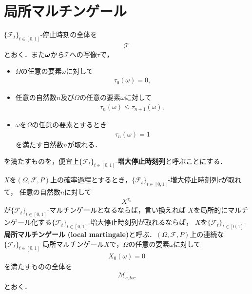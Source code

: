 \section{局所マルチンゲール}
	
	$\{\mathscr{F}_{t}\}_{t \in [0,1]}$-停止時刻の全体を
	\begin{align}
		\mathscr{T}
	\end{align}
	とおく．また${\boldsymbol \omega}$から$\mathscr{T}$への写像$\tau$で，
	\begin{itemize}
		\item $\Omega$の任意の要素$\omega$に対して
			\begin{align}
				\tau_{0}(\omega) = 0,
			\end{align}
			
		\item 任意の自然数$n$及び$\Omega$の任意の要素$\omega$に対して
			\begin{align}
				\tau_{n}(\omega) \leq \tau_{n+1}(\omega),
			\end{align}
			
		\item $\omega$を$\Omega$の任意の要素とするとき
			\begin{align}
				\tau_{n}(\omega) = 1
			\end{align}
			を満たす自然数$n$が取れる．
	\end{itemize}
	
	を満たすものを，便宜上$\{\mathscr{F}_{t}\}_{t \in [0,1]}$-{\bf 増大停止時刻列}と呼ぶことにする．
	
	\begin{screen}
		\begin{dfn}[局所マルチンゲール]
			$X$を$(\Omega,\mathscr{F},P)$上の確率過程とするとき，$\{\mathscr{F}_{t}\}_{t \in [0,1]}$-増大停止時刻列$\tau$が取れて，
			任意の自然数$n$に対して
			\begin{align}
				X^{\tau_{n}}
			\end{align}
			が$\{\mathscr{F}_{t}\}_{t \in [0,1]}$-マルチンゲールとなるならば，言い換えれば
			$X$を局所的にマルチンゲール化する$\{\mathscr{F}_{t}\}_{t \in [0,1]}$-増大停止時刻列が取れるならば，
			$X$を$\{\mathscr{F}_{t}\}_{t \in [0,1]}$-{\bf 局所マルチンゲール}
			{\bf (local martingale)}と呼ぶ．$(\Omega,\mathscr{F},P)$上の連続な
			$\{\mathscr{F}_{t}\}_{t \in [0,1]}$-局所マルチンゲール$X$で，$\Omega$の任意の要素$\omega$に対して
			\begin{align}
				X_{0}(\omega) = 0
			\end{align}
			を満たすものの全体を
			\begin{align}
				\mathscr{M}_{c,loc}
			\end{align}
			とおく．
		\end{dfn}
	\end{screen}
	

